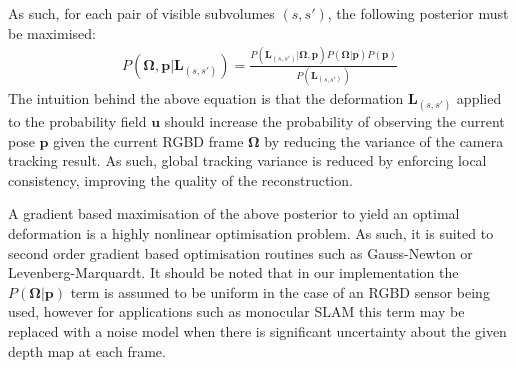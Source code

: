 As such, for each pair of visible subvolumes $(s, s')$, the following posterior must be maximised:
\begin{equation}
\begin{split}
P(\bm{\Omega}, \bm{p} | \bm{L}_{(s, s')}) = \frac{P(\bm{L}_{(s, s')} | \bm{\Omega}, \bm{p}) P(\bm{\Omega} | \bm{p})P(\bm{p})}
{P(\bm{L}_{(s, s')})}
\end{split}
\end{equation}
The intuition behind the above equation is that the deformation $\bm{L}_{(s, s')}$ applied to the probability field $\bm{u}$ should 
increase the probability of observing the current pose $\bm{p}$ given the current RGBD frame $\bm{\Omega}$ by reducing the 
variance of the camera tracking result. As such, global tracking variance is reduced by enforcing local consistency, improving the quality 
of the reconstruction.

A gradient based maximisation of the above posterior to yield an optimal deformation is a highly nonlinear optimisation problem. As such, it is suited 
to second order gradient based optimisation routines such as Gauss-Newton or Levenberg-Marquardt.
It should be noted that in our implementation the $P(\bm{\Omega} | \bm{p})$ term is assumed to be uniform in the case of an 
RGBD sensor being used, however for applications such as monocular SLAM this term may be replaced with a noise model when there is 
significant uncertainty about the given depth map at each frame.


